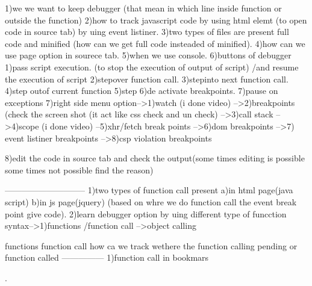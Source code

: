 
1)we we want to keep debugger (that mean in which line inside function or outside the function)
2)how to track javascript code by using html elemt (to open code in source tab) by uing event listiner.
3)two types of files are present full code and minified (how can we get full code insteaded of minified).
4)how can we use page option in sourece tab.
5)when we use console.
6)buttons of debugger 1)pass script execution. (to stop the execution of output of script) /and resume the execution of script
                      2)stepover function call.
                      3)stepinto next function call.
                      4)step outof current function
                      5)step
                      6)de activate breakpoints.
                      7)pause on exceptions
7)right side menu option-->1)watch (i done video)
                        -->2)breakpoints (check the screen shot (it act like css check and un check)
                        -->3)call stack
                        -->4)scope (i done video)
                        --5)xhr/fetch break points
                        -->6)dom breakpoints
                        -->7) event listiner breakpoints
                        -->8)csp violation breakpoints

8)edit the code in source tab and check the output(some times editing is possible some times not possible find the reason)

-----------------------------
1)two types of function call present a)in html page(java script) b)in js page(jquery) (based on whre we do function call the event break point give code).
2)learn debugger option by uing different  type of funcction syntax-->1)functions /function call
                                                                   -->object calling 

functions
function call
how ca we track wethere the function calling pending or function called
---------------
1)function call in bookmars

.

